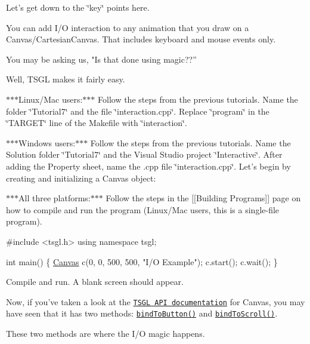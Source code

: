 Let's get down to the \char`\"{}key\char`\"{} points here.

You can add I/\-O interaction to any animation that you draw on a Canvas/\-Cartesian\-Canvas. That includes keyboard and mouse events only.

You may be asking us, "Is that done using magic??”

Well, T\-S\-G\-L makes it fairly easy.

$\ast$$\ast$$\ast$\-Linux/\-Mac users\-:$\ast$$\ast$$\ast$ Follow the steps from the previous tutorials. Name the folder \char`\"{}\-Tutorial7\char`\"{} and the file \char`\"{}interaction.\-cpp\char`\"{}. Replace \char`\"{}program\char`\"{} in the \char`\"{}\-T\-A\-R\-G\-E\-T\char`\"{} line of the Makefile with \char`\"{}interaction\char`\"{}.

$\ast$$\ast$$\ast$\-Windows users\-:$\ast$$\ast$$\ast$ Follow the steps from the previous tutorials. Name the Solution folder \char`\"{}\-Tutorial7\char`\"{} and the Visual Studio project \char`\"{}\-Interactive\char`\"{}. After adding the Property sheet, name the .cpp file \char`\"{}interaction.\-cpp\char`\"{}. Let's begin by creating and initializing a Canvas object\-:

$\ast$$\ast$$\ast$\-All three platforms\-:$\ast$$\ast$$\ast$ Follow the steps in the \mbox{[}\mbox{[}Building Programs\mbox{]}\mbox{]} page on how to compile and run the program (Linux/\-Mac users, this is a single-\/file program).


\begin{DoxyCode}
\textcolor{preprocessor}{#include <tsgl.h>}
\textcolor{keyword}{using namespace }tsgl;

\textcolor{keywordtype}{int} main() \{
  \hyperlink{classtsgl_1_1_canvas}{Canvas} c(0, 0, 500, 500, \textcolor{stringliteral}{"I/O Example"});
  c.start();
  c.wait();
\}
\end{DoxyCode}


Compile and run. A blank screen should appear.

Now, if you've taken a look at the \href{http://calvin-cs.github.io/TSGL/html/index.html}{\tt T\-S\-G\-L A\-P\-I documentation} for Canvas, you may have seen that it has two methods\-: \href{http://calvin-cs.github.io/TSGL/html/classtsgl_1_1_canvas.html#a26f2f1acf2b80eee95e42bc13dbc7600}{\tt bind\-To\-Button()} and \href{http://calvin-cs.github.io/TSGL/html/classtsgl_1_1_canvas.html#aecd3d94790d2e660db380a5e951ae394}{\tt bind\-To\-Scroll()}.

These two methods are where the I/\-O magic happens.


